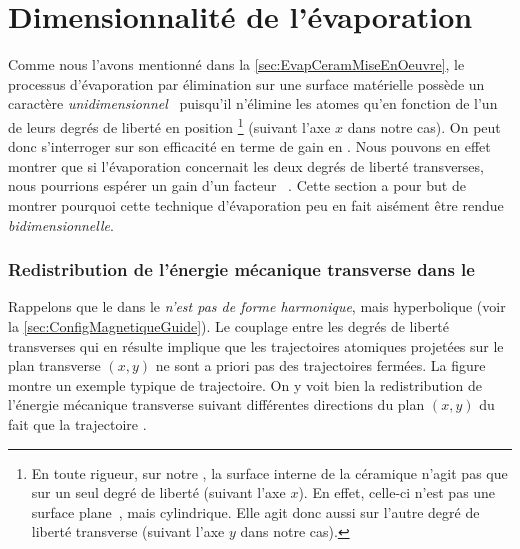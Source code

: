 \section{Dimensionnalité de l'évaporation}\label{sec:CeramBiDimensionnalité}
Comme nous l'avons mentionné dans la \autoref{sec:EvapCeramMiseEnOeuvre}, le processus d'évaporation par élimination sur une surface matérielle possède un caractère \emph{unidimensionnel}~\cite{HMO03} puisqu'il n'élimine les atomes qu'en fonction de l'un de leurs degrés de liberté en position%
\footnote{En toute rigueur, sur notre \setup, la surface interne de la céramique n'agit pas que sur un seul degré de liberté (suivant l'axe $x$). En effet, celle-ci n'est pas une surface plane~\cite{HMO03}, mais cylindrique. Elle agit donc aussi sur l'autre degré de liberté transverse (suivant l'axe $y$ dans notre cas).}
(suivant l'axe $x$ dans notre cas). 
On peut donc s'interroger sur son efficacité en terme de gain en \ddedpup. Nous pouvons en effet montrer que si l'évaporation concernait les deux degrés de liberté transverses, nous pourrions espérer un gain d'un facteur ~\cite{LaG05}.
%
Cette section a pour but de montrer pourquoi cette technique d'évaporation peu en fait aisément être rendue \emph{bidimensionnelle}.

\subsubsection{Redistribution de l'énergie mécanique transverse dans le \ppthyp}
Rappelons que le \ppt dans le \gm \emph{n'est pas de forme harmonique}, mais hyperbolique (voir la \autoref{sec:ConfigMagnetiqueGuide}). Le couplage entre les degrés de liberté transverses qui en résulte implique que les trajectoires atomiques projetées sur le plan transverse $(x,y)$ ne sont a priori pas des trajectoires fermées. La figure~ montre un exemple typique de trajectoire. On y voit bien la redistribution de l'énergie mécanique transverse suivant différentes directions du plan $(x,y)$ du fait que la trajectoire .

